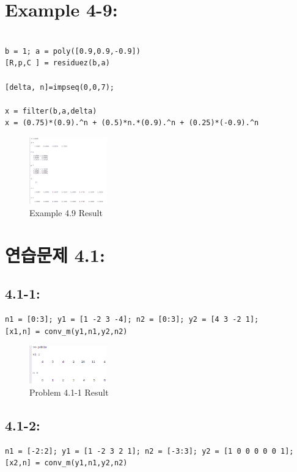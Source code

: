 \documentclass[11pt
  , a4paper
  , article
  , oneside
]{memoir}
\begin{document}
\clearpage

\chapter{Example 4-9:}
\begin{lstlisting}[style=termstyle]
%Example 4.9

b = 1; a = poly([0.9,0.9,-0.9])
[R,p,C ] = residuez(b,a)

[delta, n]=impseq(0,0,7); 

x = filter(b,a,delta)
x = (0.75)*(0.9).^n + (0.5)*n.*(0.9).^n + (0.25)*(-0.9).^n
\end{lstlisting}

\begin{figure}[h!]
	\centering
	\includegraphics[width=0.3\textwidth,height=0.15\textwidth]{./images/ex409.png}
	\caption{Example 4.9 Result}
	\label{fig:Example 4.9 Result}
\end{figure}

\chapter{연습문제 4.1: }
\section{4.1-1: }
\begin{lstlisting}[style=termstyle]
n1 = [0:3]; y1 = [1 -2 3 -4]; n2 = [0:3]; y2 = [4 3 -2 1];
[x1,n] = conv_m(y1,n1,y2,n2)
\end{lstlisting}

\begin{figure}[h!]
	\centering
	\includegraphics[width=0.3\textwidth,height=0.15\textwidth]{./images/p401-1.png}
	\caption{Problem 4.1-1 Result}
	\label{fig:Problem 4.1-1 Result}
\end{figure}
\clearpage
\section{4.1-2: }
\begin{lstlisting}[style=termstyle]
n1 = [-2:2]; y1 = [1 -2 3 2 1]; n2 = [-3:3]; y2 = [1 0 0 0 0 0 1];
[x2,n] = conv_m(y1,n1,y2,n2)
\end{lstlisting}
\end{document}
